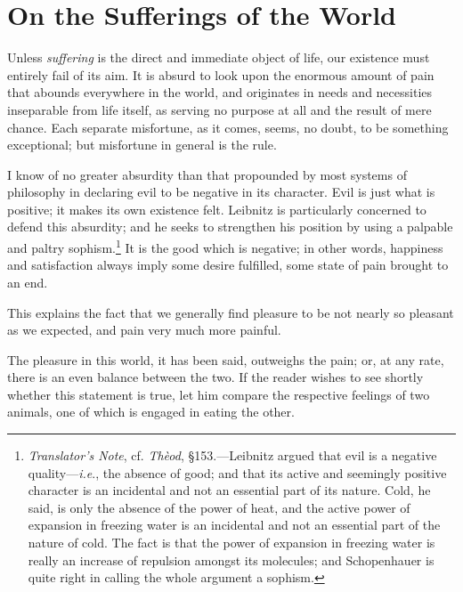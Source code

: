 
\author{Aurthur Schopenhauer}
\chapter[Aurthur Schopenhauer -- On the Sufferings of the World]{On
the Sufferings of the World}


Unless \textit{suffering} is the direct and immediate object
of life, our existence must entirely fail of its aim. It is absurd to
look upon the enormous amount of pain that abounds everywhere in the
world, and originates in needs and necessities inseparable from life
itself, as serving no purpose at all and the result of mere chance.
Each separate misfortune, as it comes, seems, no doubt, to be
something exceptional; but misfortune in general is the rule.

I know of no greater absurdity than that propounded by most systems of
philosophy in declaring evil to be negative in its character. Evil is
just what is positive; it makes its own existence felt. Leibnitz is
particularly concerned to defend this absurdity; and he seeks to
strengthen his position by using a palpable and paltry
sophism.\footnote{\textit{Translator's Note}, cf. \textit{Th\`eod},
\S153.---Leibnitz argued that evil is a negative
quality---\textit{i.e}., the absence of good; and that its active and
seemingly positive character is an incidental and not an essential
part of its nature. Cold, he said, is only the absence of the power of
heat, and the active power of expansion in freezing water is an
incidental and not an essential part of the nature of cold. The fact
is that the power of expansion in freezing water is really an increase
of repulsion amongst its molecules; and Schopenhauer is quite right in
calling the whole argument a sophism.} It is the good which is
negative; in other words, happiness and satisfaction always imply some
desire fulfilled, some state of pain brought to an end.

This explains the fact that we generally find  pleasure to be
not nearly so pleasant as we expected, and pain very much more
painful.

The pleasure in this world, it has been said, outweighs the pain; or,
at any rate, there is an even balance between the two. If the reader
wishes to see shortly whether this statement is true, let him compare
the respective feelings of two animals, one of which is engaged in
eating the other.

